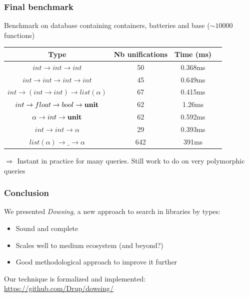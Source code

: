 \documentclass[aspectratio=169,dvipsnames,svgnames,10pt]{beamer}
\begin{document}
\begin{frame}[fragile]
  \frametitle{Final benchmark}

  Benchmark on database containing containers, batteries and base ($\sim 10000$ functions)
\begin{table}[h]
  \centering
  \begin{tabular}{|*{4}{c|}}
    \hline
      Type &
      Nb unifications &
      Time (ms)
    \\
    \hline
      $int \rightarrow int \rightarrow int$ &
      50 & 0.368ms 
    \\
      $int \rightarrow int \rightarrow int \rightarrow int$ &
      45 & 0.649ms 
    \\
      $int \rightarrow (int \rightarrow int) \rightarrow list (\alpha)$ &
      67 & 0.415ms 
    \\
      $int \rightarrow float \rightarrow bool \rightarrow \bold{unit}$ &
      62 & 1.26ms 
    \\
      $\alpha \rightarrow int \rightarrow \bold{unit}$ &
      62 & 0.592ms 
    \\
      $int \rightarrow int \rightarrow \alpha$ &
      29 & 0.393ms 
    \\
      $list(\alpha) \rightarrow \_ \rightarrow \alpha$ &
      642 & 391ms 
    \\
    \hline
  \end{tabular}

\end{table}
  $\Rightarrow$ Instant in practice for many queries. Still work to do on very
  polymorphic queries
\end{frame}


\begin{frame}
  \frametitle{Conclusion}

  We presented \emph{Dowsing}, a new approach to search in libraries by types:
  \begin{itemize}
  \item Sound and complete
  \item Scales well to medium ecosystem (and beyond?)
  \item Good methodological approach to improve it further
  \end{itemize}
  
  Our technique is formalized and implemented: \url{https://github.com/Drup/dowsing/}
\end{frame}
\end{document}
